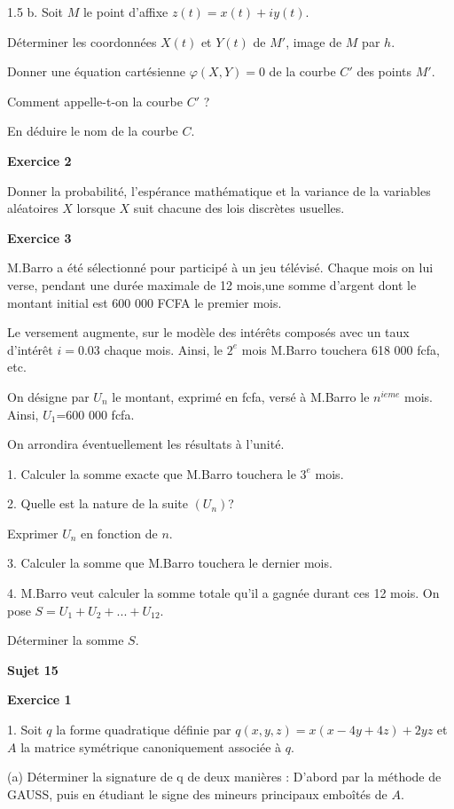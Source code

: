 \documentclass[12pt]{article}
\begin{document}
\begin{spacing}{1.5}
b. Soit $M$  le point d'affixe $z(t) = x(t) + iy(t)$. 

Déterminer les coordonnées $X(t)$ et $Y(t)$ de $M'$, image de $M$ par $h$. 

Donner une équation cartésienne $\varphi (X,Y)=0$ de la courbe $C'$ des points $M'$. 

Comment appelle-t-on la courbe $C'$ ? 

En déduire le nom de la courbe $C$. 


\medskip\textbf{Exercice 2}

 Donner la probabilité, l'espérance mathématique et la variance de la variables aléatoires $X$ lorsque $X$ suit chacune des lois discrètes usuelles.
 
\medskip\textbf{Exercice 3}

M.Barro a été sélectionné pour participé à un jeu télévisé. Chaque mois on lui verse, pendant une durée maximale de 12 mois,une somme d'argent dont le montant initial est 600 000 FCFA le premier mois.

 Le versement augmente, sur le modèle des intérêts composés avec un taux d'intérêt $i=0.03$ chaque mois. Ainsi, le $2^{e}$ mois M.Barro touchera 618 000 fcfa, etc. 
 
 On désigne par $U_n$ le montant, exprimé en fcfa, versé à M.Barro le $n^{ieme}$ mois. Ainsi, $U_1$=600 000 fcfa.
 
 On arrondira éventuellement les résultats à l'unité.

1. Calculer la somme exacte que M.Barro touchera le $3^{e}$ mois.

2. Quelle est la nature de la suite $(U_n)$? 

Exprimer $U_n$ en fonction de $ n$.

3. Calculer la somme que M.Barro touchera le dernier mois.

4. M.Barro veut calculer la somme totale qu'il a gagnée durant ces 12 mois. On pose $S=U_1+U_2+...+
 U_{12}$.

Déterminer la somme $S$.


\quad
\quad

\medskip\textbf{Sujet 15}

\medskip\textbf{Exercice 1}

1. Soit $q$ la forme quadratique définie par $q(x,y,z) = x(x-4y + 4z) +2yz$ et $A$ la matrice symétrique canoniquement associée à $q$.

(a) Déterminer la signature de q de deux manières :
 D'abord par la méthode de GAUSS, puis en étudiant le signe des mineurs principaux emboîtés de $A$.


\end{spacing}
\end{document}

